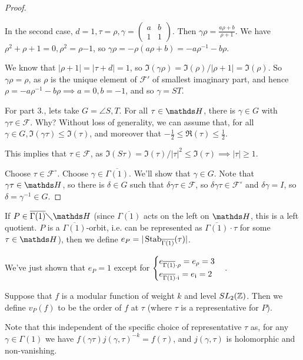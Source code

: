 \documentclass[10pt,a4paper]{article}
\begin{document}
\begin{proof}
\begin{enumerate}
    In the second case, $d = 1, \tau  = \rho, \gamma=\begin{pmatrix}a&b\\1&1\end{pmatrix}$. Then $\gamma\rho = \frac{a\rho+b}{\rho + 1}$. We have $\rho^2+\rho+1 = 0, \rho^2 = \rho{-1}$, so $\gamma\rho = -\rho(a\rho+b) = -a\rho^{-1}-b\rho$.

    We know that $|\rho + 1| = |\tau+d| = 1$, so $\Im(\gamma\rho) = \Im(\rho)/|\rho+1| = \Im(\rho)$. So $\gamma\rho = \rho$, as $\rho$ is the unique element of $\mathscr{F}'$ of smallest imaginary part, and hence $\rho = -a\rho^{-1}-b\rho\implies a=0, b = -1$, and so $\gamma = ST$.
  \end{enumerate}

  For part 3., lets take $G = \angle{S,T}$. For all $\tau \in \H$, there is $\gamma \in G$ with $\gamma \tau \in \mathscr{F}$. Why? Without loss of generality, we can assume that, for all $\gamma \in G, \Im(\gamma\tau) \leq \Im(\tau)$, and moreover that $-\frac12 \leq \Re(\tau)\leq \frac12$.

  This implies that $\tau \in \mathscr{F}$, as $\Im(S\tau) = \Im(\tau)/|\tau|^2 \leq \Im(\tau) \implies |\tau| \geq 1$.

  Choose $\tau \in \mathscr{F}^\circ$. Choose $\gamma \in \overline{\Gamma(1)}$. We'll show that $\gamma \in G$. Note that $\gamma\tau \in \H$, so there is $\delta \in G$ such that $\delta\gamma\tau \in \mathscr{F}$, so $\delta\gamma\tau \in \mathscr{F}^\circ$ and $\delta\gamma = I$, so $\delta =\gamma^{-1} \in G$.
\end{proof}
If $P \in \overline{\Gamma(1)} \diagdown \H$ (since $\overline{\Gamma(1)}$ acts on the left on $\H$, this is a left quotient. $P$ is a $\overline{\Gamma(1)}$-orbit, i.e. can be represented as $\overline{\Gamma(1)}\cdot \tau$ for some $\tau \in \H$), then we define $e_P = |\operatorname{Stab}_{\overline{\Gamma(1)}}(\tau)|$.

We've just shown that $e_P = 1$ except for $\begin{cases} e_{\overline{\Gamma(1)}\cdot \rho} = e_\rho = 3\\ e_{\overline{\Gamma(1)}\cdot \mathfrak{i}} = e_{\mathfrak{i}} = 2\end{cases}$.

Suppose that $f$ is a modular function of weight $k$ and level $SL_2(\mathbb{Z})$. Then we define $v_P(f)$ to be the order of $f$ at $\tau$ (where $\tau$ is a representative for $P$).

Note that this independent of the specific choice of representative $\tau$ as, for any $\gamma \in \Gamma(1)$ we have $f(\gamma\tau)j(\gamma,\tau)^{-k} = f(\tau)$, and $j(\gamma,\tau)$ is holomorphic and non-vanishing.
\end{document}
